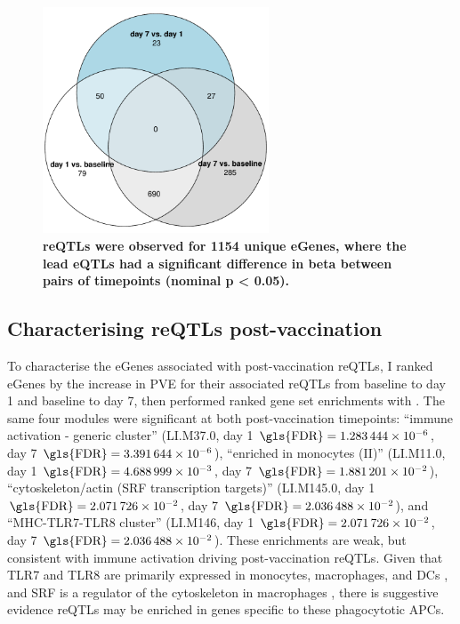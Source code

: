 \begin{figure}
    \centering
    \includegraphics[width=0.6\textwidth]{mainmatter/figures/chapter_03/compare_dge_eqtl.pairwise_reQTL_venn.pdf}
    \caption{
        \textbf{\glspl{reQTL} were observed for 1154 unique eGenes, where the lead \glspl{eQTL} had a significant difference in beta between pairs of timepoints (nominal p < 0.05).}
    }
    \label{fig:hird_reQTL_pairwise_venn}
\end{figure}

\subsection{Characterising reQTLs post-vaccination}

To characterise the eGenes associated with post-vaccination \glspl{reQTL},
I ranked eGenes by the increase in \gls{PVE} for their associated \glspl{reQTL} from baseline to day 1 and baseline to day 7,
then performed ranked gene set enrichments with  \autocite{weiner3rd2016TmodPackageGeneral}.
%
%
The same four modules were significant at both post-vaccination timepoints:
\enquote{immune activation - generic cluster} (LI.M37.0, day 1 $\text{\gls{FDR}} = \num{1.283444e-06}$, day 7 $\text{\gls{FDR}} = \num{3.391644e-06}$),
\enquote{enriched in monocytes (II)} (LI.M11.0, day 1 $\text{\gls{FDR}} = \num{4.688999e-03}$, day 7 $\text{\gls{FDR}} = \num{1.881201e-02}$),
\enquote{cytoskeleton/actin (SRF transcription targets)} (LI.M145.0, day 1 $\text{\gls{FDR}} = \num{2.071726e-02}$, day 7 $\text{\gls{FDR}} = \num{2.036488e-02}$),
and \enquote{MHC-TLR7-TLR8 cluster} (LI.M146, day 1 $\text{\gls{FDR}} = \num{2.071726e-02}$, day 7 $\text{\gls{FDR}} = \num{2.036488e-02}$).
These enrichments are weak, but consistent with immune activation driving post-vaccination \glspl{reQTL}.
Given that TLR7 and TLR8 are primarily expressed in monocytes, macrophages, and \glspl{DC} \autocite{cervantes2012TLR8ForgottenRelative},
and SRF is a regulator of the cytoskeleton in macrophages \autocite{sullivan2011SerumResponseFactor}, 
there is suggestive evidence \glspl{reQTL} may be enriched in genes specific to these phagocytotic \glspl{APC}.

